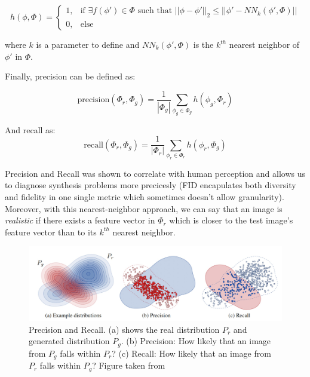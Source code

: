\[
      h(\phi, \Phi) = 
\begin{cases}
    1,& \text{if } \exists f(\phi') \in \Phi \text{ such that }||\phi - \phi'||_2 \le ||\phi' - NN_k(\phi', \Phi)||\\
    0,              & \text{else}
\end{cases}
\]

\noindent where $k$ is a parameter to define and $NN_k(\phi', \Phi)$ is the $k^{th}$ nearest neighbor of $\phi'$ in $\Phi$.

Finally, precision can be defined as:

\begin{equation}
      \text{precision}(\Phi_r, \Phi_g) = \frac{1}{|\Phi_g|}\sum_{\phi_g \in \Phi_g}{h(\phi_g, \Phi_r)}
\end{equation}

And recall as: 
\begin{equation}
      \text{recall}(\Phi_r, \Phi_g) = \frac{1}{|\Phi_r|}\sum_{\phi_r \in \Phi_r}{h(\phi_r, \Phi_g)}
\end{equation}


Precision and Recall was shown to correlate with human perception and allows us to 
diagnose synthesis problems more precicesly (\ac{FID} encapulates both diversity and fidelity 
in one single metric which sometimes doesn't allow granularity). Moreover, with this nearest-neighbor 
approach, we can say that an image is \emph{realistic} if there exists a feature vector in $\Phi_r$
which is closer to the test image's feature vector than to its $k^{th}$ nearest neighbor.



\begin{figure}[tb]
      \begin{center}
          \includegraphics[width=0.7\linewidth]{images/related/precision_recall.jpg}
      \end{center}
      \caption{Precision and Recall. (a) shows the real  distribution $P_r$ and generated distribution $P_g$. (b) Precision: How likely that an image from $P_g$ falls within $P_r$? (c) Recall: How likely that an image from $P_r$ falls within $P_g$? Figure taken from \cite{kynkaanniemi2019improved}}
      \label{fig:precision_recall}
  \end{figure}



